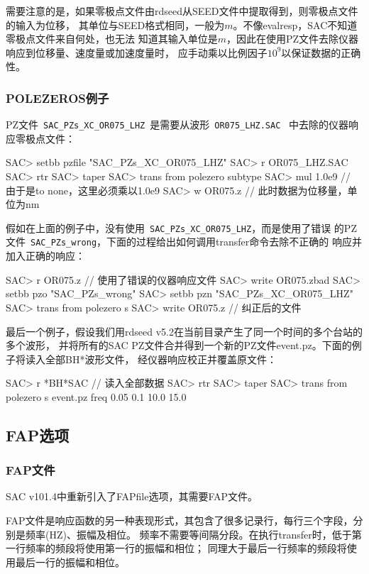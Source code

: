 需要注意的是，如果零极点文件由rdseed从SEED文件中提取得到，则零极点文件的输入为位移，
其单位与SEED格式相同，一般为$m$。不像evalresp，SAC不知道零极点文件来自何处，也无法
知道其输入单位是$m$，因此在使用PZ文件去除仪器响应到位移量、速度量或加速度量时，
应手动乘以比例因子$10^9$以保证数据的正确性。

\subsubsection{POLEZEROS例子}
PZ文件~\lstinline{SAC_PZs_XC_OR075_LHZ}~是需要从波形~\lstinline{OR075_LHZ.SAC}~
中去除的仪器响应零极点文件：
\begin{SACCode}
SAC> setbb pzfile "SAC_PZs_XC_OR075_LHZ"
SAC> r OR075_LHZ.SAC
SAC> rtr
SAC> taper
SAC> trans from polezero subtype %
SAC> mul 1.0e9          // 由于是to none，这里必须乘以1.0e9
SAC> w OR075.z          // 此时数据为位移量，单位为nm
\end{SACCode}

假如在上面的例子中，没有使用~\lstinline{SAC_PZs_XC_OR075_LHZ}，而是使用了错误
的PZ文件~\lstinline{SAC_PZs_wrong}，下面的过程给出如何调用transfer命令去除不正确的
响应并加入正确的响应：
\begin{SACCode}
SAC> r OR075.z                  // 使用了错误的仪器响应文件
SAC> write OR075.zbad
SAC> setbb pzo "SAC_PZs_wrong"
SAC> setbb pzn "SAC_PZs_XC_OR075_LHZ"
SAC> trans from polezero s %
SAC> write OR075.z              // 纠正后的文件
\end{SACCode}

最后一个例子，假设我们用rdseed v5.2在当前目录产生了同一个时间的多个台站的多个波形，
并将所有的SAC PZ文件合并得到一个新的PZ文件event.pz。下面的例子将读入全部BH*波形文件，
经仪器响应校正并覆盖原文件：
\begin{SACCode}
SAC> r *BH*SAC          // 读入全部数据
SAC> rtr
SAC> taper
SAC> trans from polezero s event.pz freq 0.05 0.1 10.0 15.0
\end{SACCode}

\subsection{FAP选项}
\subsubsection{FAP文件}
SAC v101.4中重新引入了FAPfile选项，其需要FAP文件。

FAP文件是响应函数的另一种表现形式，其包含了很多记录行，每行三个字段，分别是频率(HZ)、振幅及相位。
频率不需要等间隔分段。在执行transfer时，低于第一行频率的频段将使用第一行的振幅和相位；
同理大于最后一行频率的频段将使用最后一行的振幅和相位。

